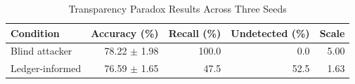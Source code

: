 \begin{table}[t]
\caption{Transparency Paradox Results Across Three Seeds}
\label{tab:transparency_actual}
\centering
\scriptsize
\begin{tabular}{lrrrr}
\toprule
Condition & Accuracy (\%) & Recall (\%) & Undetected (\%) & Scale \\
\midrule
Blind attacker & 78.22 $\pm$ 1.98 & 100.0 & 0.0 & 5.00 \\
Ledger-informed & 76.59 $\pm$ 1.65 & 47.5 & 52.5 & 1.63 \\
\bottomrule
\end{tabular}
\end{table}
